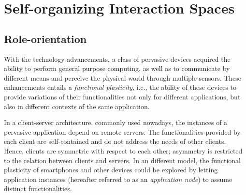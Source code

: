


\section{Self-organizing Interaction Spaces}\label{sec:edge_spaces}

\subsection{Role-orientation}

With the technology advancements, a class of pervasive devices acquired the ability to perform general purpose computing, as well as to communicate by different means and perceive the physical world through multiple sensors. These enhancements entails a \textit{functional plasticity}, i.e., the ability of these devices to provide variations of their functionalities not only for different applications, but also in different contexts of the same application. 

In a client-server architecture, commonly used nowadays, the instances of a pervasive application depend on remote servers. The functionalities provided by each client are self-contained and do not address the needs of other clients. Hence, clients are symmetric with respect to each other; asymmetry is restricted to the relation between clients and servers. 
In an different model, the functional plasticity of smartphones and other devices could be explored by letting application instances (hereafter referred to as an \textit{application node}) to assume distinct functionalities.



